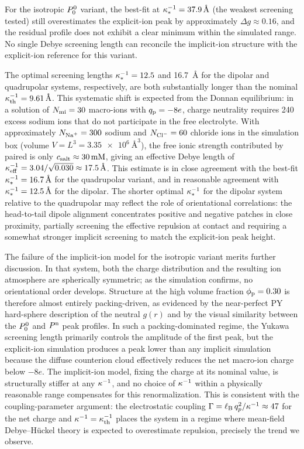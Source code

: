 \documentclass{article}
\begin{document}
For the isotropic $P^{0}_{0}$ variant, the best-fit at $\kappa^{-1}_* = \qty{37.9}{\angstrom}$ (the weakest screening tested) still overestimates the explicit-ion peak by approximately $\Delta g \approx 0.16$, and the residual profile does not exhibit a clear minimum within the simulated range.
No single Debye screening length can reconcile the implicit-ion structure with the explicit-ion reference for this variant.

The optimal screening lengths $\kappa^{-1}_* = 12.5$ and \qty{16.7}{\angstrom} for the dipolar and quadrupolar systems, respectively, are both substantially longer than the nominal $\kappa^{-1}_\mathrm{th} = \qty{9.61}{\angstrom}$.
This systematic shift is expected from the Donnan equilibrium: in a solution of $N_{\mathrm{mi}} = 30$ macro-ions with $q_{\mathrm{p}} = -8e$, charge neutrality requires 240 excess sodium ions that do not participate in the free electrolyte.
With approximately $\nna = 300$ sodium and $\ncl = 60$ chloride ions in the simulation box (volume $V = L^3 = \qty{3.35e6}{\angstrom\cubed}$), the free ionic strength contributed by paired  is only $c_\mathrm{salt} \approx \qty{30}{mM}$, giving an effective Debye length of $\kappa^{-1}_\mathrm{eff} = 3.04/\sqrt{0.030} \approx \qty{17.5}{\angstrom}$.
This estimate is in close agreement with the best-fit $\kappa^{-1}_* = \qty{16.7}{\angstrom}$ for the quadrupolar variant, and in reasonable agreement with $\kappa^{-1}_* = \qty{12.5}{\angstrom}$ for the dipolar.
The shorter optimal $\kappa^{-1}_*$ for the dipolar system relative to the quadrupolar may reflect the role of orientational correlations: the head-to-tail dipole alignment concentrates positive and negative patches in close proximity, partially screening the effective repulsion at contact and requiring a somewhat stronger implicit screening to match the explicit-ion peak height.

The failure of the implicit-ion model for the isotropic variant merits further discussion.
In that system, both the charge distribution and the resulting ion atmosphere are spherically symmetric; as the simulation confirms, no orientational order develops.
Structure at the high volume fraction $\phi_\mathrm{p} = 0.30$ is therefore almost entirely packing-driven, as evidenced by the near-perfect PY hard-sphere description of the neutral $g(r)$ and by the visual similarity between the $P^{0}_{0}$ and $P^\mathrm{n}$ peak profiles.
In such a packing-dominated regime, the Yukawa screening length primarily controls the amplitude of the first peak, but the explicit-ion simulation produces a peak lower than any implicit simulation because the diffuse counterion cloud effectively reduces the net macro-ion charge below $-8e$.
The implicit-ion model, fixing the charge at its nominal value, is structurally stiffer at any $\kappa^{-1}$, and no choice of $\kappa^{-1}$ within a physically reasonable range compensates for this renormalization.
This is consistent with the coupling-parameter argument: the electrostatic coupling $\Gamma = \ell_\mathrm{B} \, q_p^2 / \kappa^{-1} \approx 47$ for the net charge and $\kappa^{-1} = \kappa^{-1}_\mathrm{th}$ places the system in a regime where mean-field Debye--Hückel theory is expected to overestimate repulsion, precisely the trend we observe.
\end{document}
